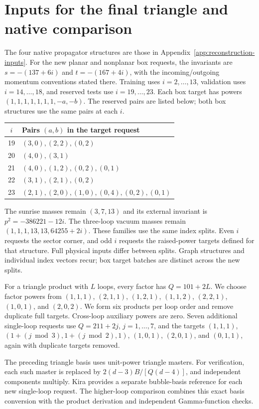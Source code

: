 \section{Inputs for the final triangle and native comparison}
\label{app:triangle-inputs}
The four native propagator structures are those in Appendix~\ref{app:reconstruction-inputs}. For the new planar and nonplanar box requests, the invariants are $s=-(137+6i)$ and $t=-(167+4i)$, with the incoming/outgoing momentum conventions stated there. Training uses $i=2,\ldots,13$, validation uses $i=14,\ldots,18$, and reserved tests use $i=19,\ldots,23$. Each box target has powers $(1,1,1,1,1,1,1,-a,-b)$. The reserved pairs are listed below; both box structures use the same pairs at each $i$.
\begin{center}\small\begin{tabular}{cl}\toprule
$i$ & Pairs $(a,b)$ in the target request\\\midrule
19 & $(3,0), (2,2), (0,2)$ \\
20 & $(4,0), (3,1)$ \\
21 & $(4,0), (1,2), (0,2), (0,1)$ \\
22 & $(3,1), (2,1), (0,2)$ \\
23 & $(2,1), (2,0), (1,0), (0,4), (0,2), (0,1)$ \\
\bottomrule\end{tabular}\end{center}
The sunrise masses remain $(3,7,13)$ and its external invariant is $p^2=-386221-12i$. The three-loop vacuum masses remain $(1,1,1,13,13,64255+2i)$. These families use the same index splits. Even $i$ requests the sector corner, and odd $i$ requests the raised-power targets defined for that structure. Full physical inputs differ between splits. Graph structures and individual index vectors recur; box target batches are distinct across the new splits.

For a triangle product with $L$ loops, every factor has $Q=101+2L$. We choose factor powers from $(1,1,1)$, $(2,1,1)$, $(1,2,1)$, $(1,1,2)$, $(2,2,1)$, $(1,0,1)$, and $(2,0,2)$. We form six products per loop order and remove duplicate full targets. Cross-loop auxiliary powers are zero. Seven additional single-loop requests use $Q=211+2j$, $j=1,\ldots,7$, and the targets $(1,1,1)$, $(1+(j\bmod3),1+(j\bmod2),1)$, $(1,0,1)$, $(2,0,1)$, and $(0,1,1)$, again with duplicate targets removed.

The preceding triangle basis uses unit-power triangle masters. For verification, each such master is replaced by $2(d-3)B/[Q(d-4)]$, and independent components multiply. Kira provides a separate bubble-basis reference for each new single-loop request. The higher-loop comparison combines this exact basis conversion with the product derivation and independent Gamma-function checks.
